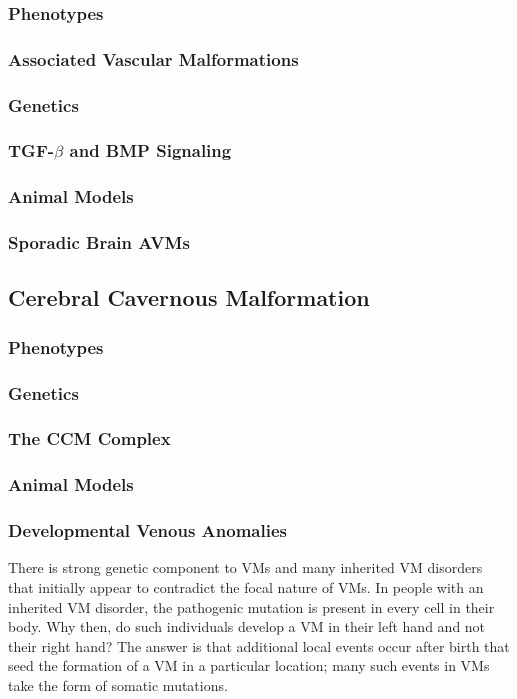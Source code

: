\subsubsection{Phenotypes}
\subsubsection{Associated Vascular Malformations}
\subsubsection{Genetics}
\subsubsection{TGF-$\beta$ and BMP Signaling}
\subsubsection{Animal Models}
\subsubsection{Sporadic Brain AVMs}

\subsection{Cerebral Cavernous Malformation}

\subsubsection{Phenotypes}
\subsubsection{Genetics}
\subsubsection{The CCM Complex}
\subsubsection{Animal Models}
\subsubsection{Developmental Venous Anomalies}





There is strong genetic component to VMs and many inherited VM disorders that initially appear to contradict the focal nature of VMs. In people with an inherited VM disorder, the pathogenic mutation is present in every cell in their body. Why then, do such individuals develop a VM in their left hand and not their right hand? The answer is that additional local events occur after birth that seed the formation of a VM in a particular location; many such events in VMs take the form of somatic mutations. 

